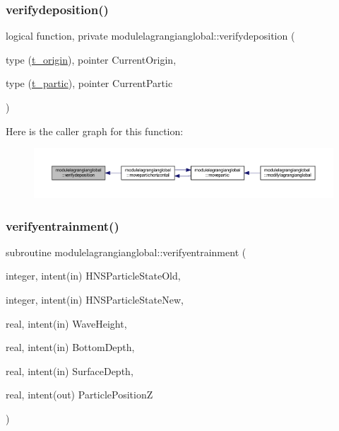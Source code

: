 \subsubsection{\texorpdfstring{verifydeposition()}{verifydeposition()}}
{\footnotesize\ttfamily logical function, private modulelagrangianglobal\+::verifydeposition (\begin{DoxyParamCaption}\item[{type (\mbox{\hyperlink{structmodulelagrangianglobal_1_1t__origin}{t\+\_\+origin}}), pointer}]{Current\+Origin,  }\item[{type (\mbox{\hyperlink{structmodulelagrangianglobal_1_1t__partic}{t\+\_\+partic}}), pointer}]{Current\+Partic }\end{DoxyParamCaption})\hspace{0.3cm}{\ttfamily [private]}}

Here is the caller graph for this function\+:\nopagebreak
\begin{figure}[H]
\begin{center}
\leavevmode
\includegraphics[width=350pt]{namespacemodulelagrangianglobal_ac2e61e57ce9a9bd0aef7e60998c77a7b_icgraph}
\end{center}
\end{figure}
\mbox{\label{namespacemodulelagrangianglobal_ad6565cf35585f706dfd2fa59deaed3b4}} 
\subsubsection{\texorpdfstring{verifyentrainment()}{verifyentrainment()}}
{\footnotesize\ttfamily subroutine modulelagrangianglobal\+::verifyentrainment (\begin{DoxyParamCaption}\item[{integer, intent(in)}]{H\+N\+S\+Particle\+State\+Old,  }\item[{integer, intent(in)}]{H\+N\+S\+Particle\+State\+New,  }\item[{real, intent(in)}]{Wave\+Height,  }\item[{real, intent(in)}]{Bottom\+Depth,  }\item[{real, intent(in)}]{Surface\+Depth,  }\item[{real, intent(out)}]{Particle\+PositionZ }\end{DoxyParamCaption})\hspace{0.3cm}{\ttfamily [private]}}


